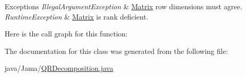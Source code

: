 \begin{DoxyExceptions}{Exceptions}
{\em Illegal\+Argument\+Exception} & \hyperlink{class_jama_1_1_matrix}{Matrix} row dimensions must agree. \\
\hline
{\em Runtime\+Exception} & \hyperlink{class_jama_1_1_matrix}{Matrix} is rank deficient. \\
\hline
\end{DoxyExceptions}


Here is the call graph for this function\+:




The documentation for this class was generated from the following file\+:\begin{DoxyCompactItemize}
\item 
java/\+Jama/\hyperlink{_q_r_decomposition_8java}{Q\+R\+Decomposition.\+java}\end{DoxyCompactItemize}
